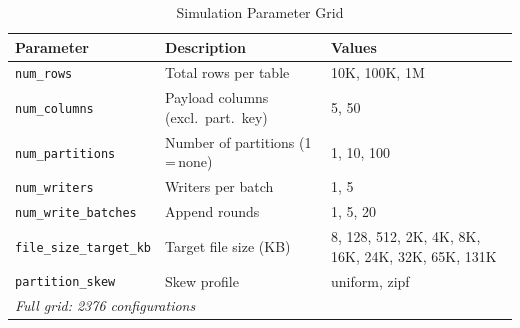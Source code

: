 \begin{table}[t]
\setlength{\abovecaptionskip}{4pt}
\setlength{\belowcaptionskip}{-4pt}
\centering
\caption{Simulation Parameter Grid}
\label{tab:params}
\footnotesize
\begin{tabular}{lp{1.8cm}p{2.8cm}}
\toprule
\textbf{Parameter} & \textbf{Description} & \textbf{Values} \\
\midrule
\texttt{num\_rows} & Total rows per table & 10K, 100K, 1M \\
\texttt{num\_columns} & Payload columns (excl.\ part.\ key) & 5, 50 \\
\texttt{num\_partitions} & Number of partitions (1\,=\,none) & 1, 10, 100 \\
\texttt{num\_writers} & Writers per batch & 1, 5 \\
\texttt{num\_write\_batches} & Append rounds & 1, 5, 20 \\
\texttt{file\_size\_target\_kb} & Target file size (KB) & 8, 128, 512, 2K, 4K, 8K, 16K, 24K, 32K, 65K, 131K \\
\texttt{partition\_skew} & Skew profile & uniform, zipf \\
\midrule
\multicolumn{3}{l}{\textit{Full grid: 2376 configurations}} \\
\bottomrule
\end{tabular}
\end{table}
